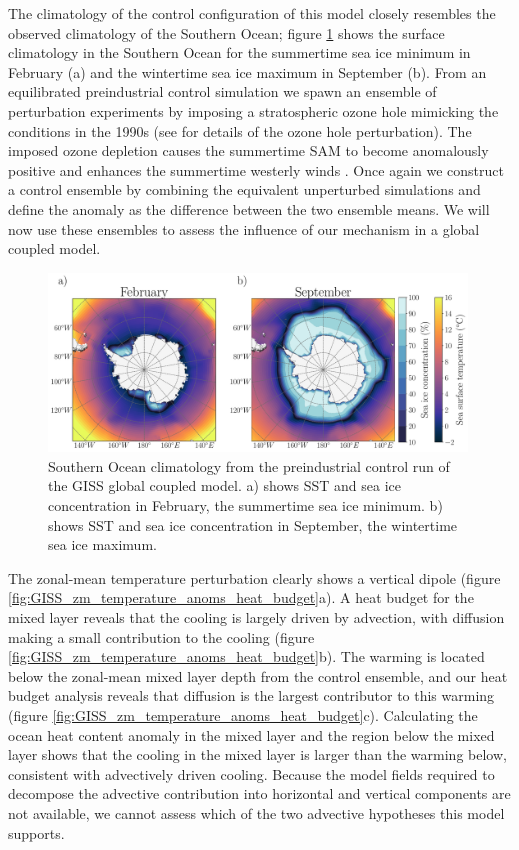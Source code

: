\documentclass{ametsocV5}
\begin{document}
The climatology of the control configuration of this model closely resembles the observed climatology of the Southern Ocean; figure \ref{fig:GISS_overview} shows the surface climatology in the Southern Ocean for the summertime sea ice minimum in February (a) and the wintertime sea ice maximum in September (b). From an equilibrated preindustrial control simulation we spawn an ensemble of perturbation experiments by imposing a stratospheric ozone hole mimicking the conditions in the 1990s (see \citet{Doddridge2019a} for details of the ozone hole perturbation). The imposed ozone depletion causes the summertime SAM to become anomalously positive and enhances the summertime westerly winds \citep{Polvani2011}. Once again we construct a control ensemble by combining the equivalent unperturbed simulations and define the anomaly as the difference between the two ensemble means. We will now use these ensembles to assess the influence of our mechanism in a global coupled model.






\begin{figure}[!ht]
    \begin{center}
        \includegraphics[width=0.99\textwidth]{figures/GISS_overview.pdf}
        \caption{Southern Ocean climatology from the preindustrial control run of the GISS global coupled model. a) shows SST and sea ice concentration in February, the summertime sea ice minimum. b) shows SST and sea ice concentration in September, the wintertime sea ice maximum.}
        \label{fig:GISS_overview}
    \end{center}
\end{figure}


The zonal-mean temperature perturbation clearly shows a vertical dipole (figure \ref{fig:GISS_zm_temperature_anoms_heat_budget}a). A heat budget for the mixed layer reveals that the cooling is largely driven by advection, with diffusion making a small contribution to the cooling (figure \ref{fig:GISS_zm_temperature_anoms_heat_budget}b). The warming is located below the zonal-mean mixed layer depth from the control ensemble, and our heat budget analysis reveals that diffusion is the largest contributor to this warming (figure \ref{fig:GISS_zm_temperature_anoms_heat_budget}c). Calculating the ocean heat content anomaly in the mixed layer and the region below the mixed layer shows that the cooling in the mixed layer is larger than the warming below, consistent with advectively driven cooling. Because the model fields required to decompose the advective contribution into horizontal and vertical components are not available, we cannot assess which of the two advective hypotheses this model supports. 
\end{document}
